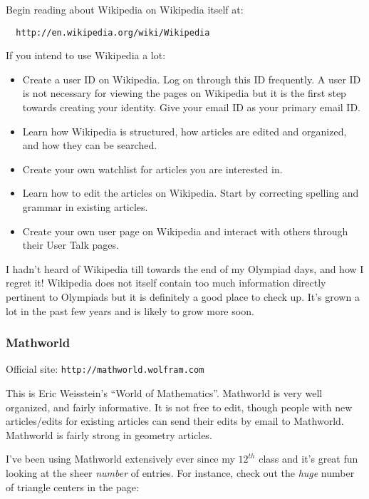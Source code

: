 \documentclass[a4paper]{amsart}
\begin{document}
Begin reading about Wikipedia on Wikipedia itself at:

\begin{verbatim}
  http://en.wikipedia.org/wiki/Wikipedia
\end{verbatim}

If you intend to use Wikipedia a lot:

\begin{itemize}

\item Create a user ID on Wikipedia. Log on through this ID frequently. 
  A user ID is not necessary for viewing the pages on Wikipedia but it is the first step towards creating your identity.
  Give your email ID as your primary email ID.

\item Learn how Wikipedia is structured, how articles are edited and organized, and how they can be searched.

\item Create your own watchlist for articles you are interested in.

\item Learn how to edit the articles on Wikipedia. Start by correcting spelling and grammar in existing articles.

\item Create your own user page on Wikipedia and interact with others through their User Talk pages.

\end{itemize}

I hadn't heard of Wikipedia till towards the end of my Olympiad days, and how I regret it! Wikipedia does not itself contain
too much information directly pertinent to Olympiads but it is definitely a good place to check up. It's grown a lot in the past
few years and is likely to grow more soon.

\subsubsection{Mathworld}

Official site: {\tt http://mathworld.wolfram.com}

This is Eric Weisstein's ``World of Mathematics''. Mathworld is very well organized, and fairly informative. It is not free to edit,
though people with new articles/edits for existing articles can send their edits by email to Mathworld. Mathworld
is fairly strong in geometry articles.

I've been using Mathworld extensively ever since my $12^{th}$ class and it's great fun looking at the sheer {\em number} of entries.
For instance, check out the {\em huge} number of triangle centers in the page:
\end{document}
